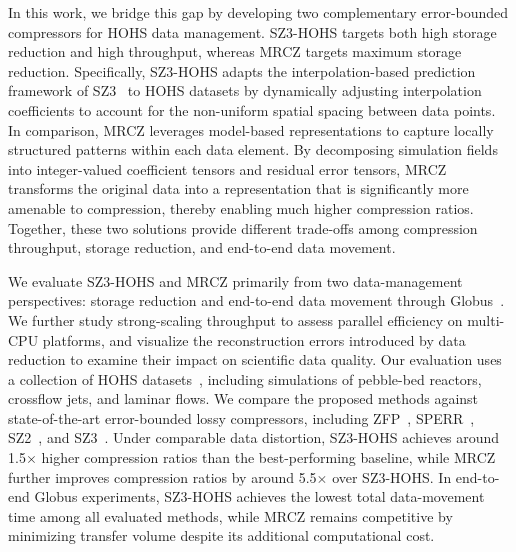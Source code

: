 In this work, we bridge this gap by developing two complementary error-bounded compressors for HOHS data management. SZ3-HOHS targets both high storage reduction and high throughput, whereas MRCZ targets maximum storage reduction.
Specifically, SZ3-HOHS adapts the interpolation-based prediction framework of SZ3~\cite{liang2022sz3,zhao2021optimizing} to HOHS datasets by dynamically adjusting interpolation coefficients to account for the non-uniform spatial spacing between data points. In comparison, MRCZ leverages model-based representations to capture locally structured patterns within each data element. By decomposing simulation fields into integer-valued coefficient tensors and residual error tensors, MRCZ transforms the original data into a representation that is significantly more amenable to compression, thereby enabling much higher compression ratios.
Together, these two solutions provide different trade-offs among compression throughput, storage reduction, and end-to-end data movement.

We evaluate SZ3-HOHS and MRCZ primarily from two data-management perspectives: storage reduction and end-to-end data movement through Globus~\cite{chard2017globus}. We further study strong-scaling throughput to assess parallel efficiency on multi-CPU platforms, and visualize the reconstruction errors introduced by data reduction to examine their impact on scientific data quality. Our evaluation uses a collection of HOHS datasets~\cite{yuan2024coupled,fischer2022nekrs}, including simulations of pebble-bed reactors, crossflow jets, and laminar flows. We compare the proposed methods against state-of-the-art error-bounded lossy compressors, including ZFP~\cite{lindstrom2014fixed}, SPERR~\cite{li2023lossy}, SZ2~\cite{tao2017significantly}, and SZ3~\cite{liang2022sz3,zhao2021optimizing}.
Under comparable data distortion, SZ3-HOHS achieves around 1.5$\times$ higher compression ratios than the best-performing baseline, while MRCZ further improves compression ratios by around 5.5$\times$ over SZ3-HOHS. In end-to-end Globus experiments, SZ3-HOHS achieves the lowest total data-movement time among all evaluated methods, while MRCZ remains competitive by minimizing transfer volume despite its additional computational cost.

